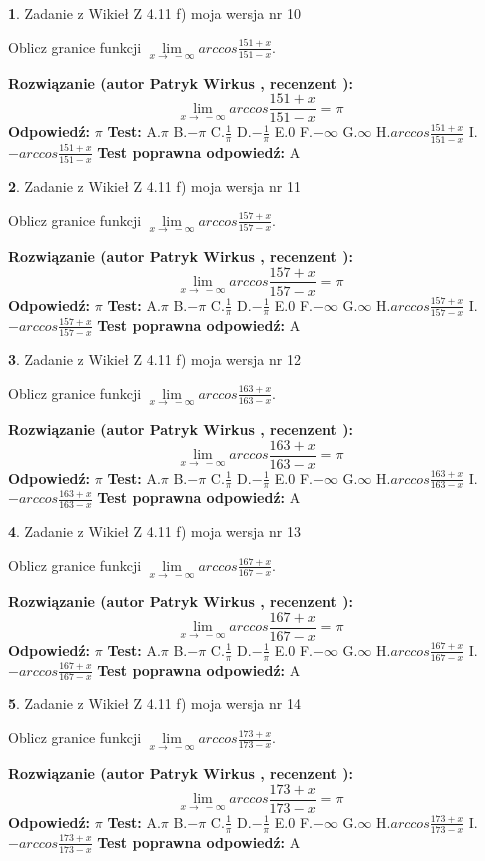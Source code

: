 \documentclass[12pt, a4paper]{article}
\theoremstyle{definition} %
\newtheorem{zad}{}
\newcommand{\zadStart}[1]{\begin{zad}#1\newline}
\newcommand{\zadStop}{\end{zad}}
\newcommand{\rozwStart}[2]{\noindent \textbf{Rozwiązanie (autor #1 , recenzent #2): }\newline}
\newcommand{\rozwStop}{\newline}
\newcommand{\odpStart}{\noindent \textbf{Odpowiedź:}\newline}
\newcommand{\odpStop}{\newline}
\newcommand{\testStart}{\noindent \textbf{Test:}\newline}
\newcommand{\testStop}{\newline}
\newcommand{\kluczStart}{\noindent \textbf{Test poprawna odpowiedź:}\newline}
\newcommand{\kluczStop}{\newline}
\begin{document}
\zadStart{Zadanie z Wikieł Z 4.11 f) moja wersja nr 10}

Oblicz granice funkcji $\lim\limits_{x\to\ -\infty}arccos\frac{151+x}{151-x}$.
\zadStop
\rozwStart{Patryk Wirkus}{}
$$\lim\limits_{x\to\ -\infty}arccos\frac{151+x}{151-x} = \pi$$
\rozwStop
\odpStart
$\pi$
\odpStop
\testStart
A.$\pi$ B.$-\pi$ C.$\frac{1}{\pi}$ D.$-\frac{1}{\pi}$ E.$0$ F.$-\infty$ G.$\infty$ H.$arccos\frac{151+x}{151-x}$ I.$-arccos\frac{151+x}{151-x}$
\testStop
\kluczStart
A
\kluczStop



\zadStart{Zadanie z Wikieł Z 4.11 f) moja wersja nr 11}

Oblicz granice funkcji $\lim\limits_{x\to\ -\infty}arccos\frac{157+x}{157-x}$.
\zadStop
\rozwStart{Patryk Wirkus}{}
$$\lim\limits_{x\to\ -\infty}arccos\frac{157+x}{157-x} = \pi$$
\rozwStop
\odpStart
$\pi$
\odpStop
\testStart
A.$\pi$ B.$-\pi$ C.$\frac{1}{\pi}$ D.$-\frac{1}{\pi}$ E.$0$ F.$-\infty$ G.$\infty$ H.$arccos\frac{157+x}{157-x}$ I.$-arccos\frac{157+x}{157-x}$
\testStop
\kluczStart
A
\kluczStop



\zadStart{Zadanie z Wikieł Z 4.11 f) moja wersja nr 12}

Oblicz granice funkcji $\lim\limits_{x\to\ -\infty}arccos\frac{163+x}{163-x}$.
\zadStop
\rozwStart{Patryk Wirkus}{}
$$\lim\limits_{x\to\ -\infty}arccos\frac{163+x}{163-x} = \pi$$
\rozwStop
\odpStart
$\pi$
\odpStop
\testStart
A.$\pi$ B.$-\pi$ C.$\frac{1}{\pi}$ D.$-\frac{1}{\pi}$ E.$0$ F.$-\infty$ G.$\infty$ H.$arccos\frac{163+x}{163-x}$ I.$-arccos\frac{163+x}{163-x}$
\testStop
\kluczStart
A
\kluczStop



\zadStart{Zadanie z Wikieł Z 4.11 f) moja wersja nr 13}

Oblicz granice funkcji $\lim\limits_{x\to\ -\infty}arccos\frac{167+x}{167-x}$.
\zadStop
\rozwStart{Patryk Wirkus}{}
$$\lim\limits_{x\to\ -\infty}arccos\frac{167+x}{167-x} = \pi$$
\rozwStop
\odpStart
$\pi$
\odpStop
\testStart
A.$\pi$ B.$-\pi$ C.$\frac{1}{\pi}$ D.$-\frac{1}{\pi}$ E.$0$ F.$-\infty$ G.$\infty$ H.$arccos\frac{167+x}{167-x}$ I.$-arccos\frac{167+x}{167-x}$
\testStop
\kluczStart
A
\kluczStop



\zadStart{Zadanie z Wikieł Z 4.11 f) moja wersja nr 14}

Oblicz granice funkcji $\lim\limits_{x\to\ -\infty}arccos\frac{173+x}{173-x}$.
\zadStop
\rozwStart{Patryk Wirkus}{}
$$\lim\limits_{x\to\ -\infty}arccos\frac{173+x}{173-x} = \pi$$
\rozwStop
\odpStart
$\pi$
\odpStop
\testStart
A.$\pi$ B.$-\pi$ C.$\frac{1}{\pi}$ D.$-\frac{1}{\pi}$ E.$0$ F.$-\infty$ G.$\infty$ H.$arccos\frac{173+x}{173-x}$ I.$-arccos\frac{173+x}{173-x}$
\testStop
\kluczStart
A
\kluczStop
\end{document}

